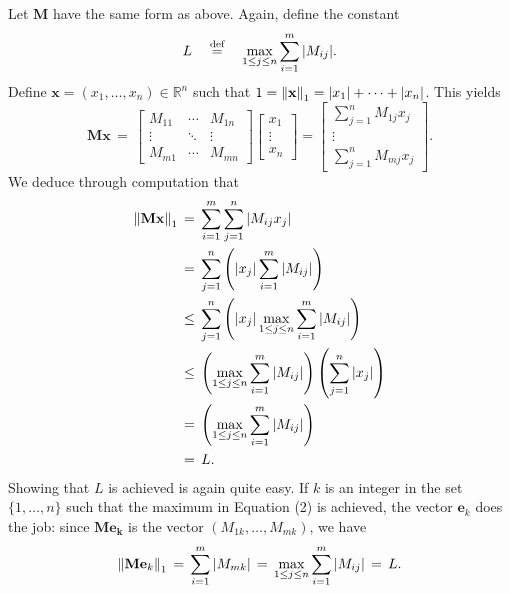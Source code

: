 \documentclass[11pt]{article}
\renewcommand{\vec}[1]{\mathbf{#1}}
\newcommand{\mat}[1]{\mathbf{#1}}
\begin{document}
Let $\mat{M}$ have the same form as above. Again, define the constant
\begin{equation}
  L \quad \stackrel{\text{def}}{=} \quad \max\limits_{1 \le j \le n} \sum\limits_{i = 1}^{m} \abs{M_{ij}}.
\end{equation}
Define $\vec{x} = (x_{1}, \ldots, x_{n}) \in \mathbb{R}^{n}$ such that $1 = \norm{\vec{x}}_{1} = \abs{x_{1}} + \cdots + \abs{x_{n}}$. This yields
\[
  \mat{M} \vec{x} \, = \, \begin{bmatrix} M_{11} & \cdots & M_{1n} \\ \vdots & \ddots & \vdots \\ M_{m1} & \cdots & M_{mn} \end{bmatrix} \begin{bmatrix} x_{1} \\ \vdots \\ x_{n} \end{bmatrix} = \begin{bmatrix} \sum\limits_{j = 1}^{n} M_{1j}x_{j} \\ \vdots \\ \sum\limits_{j = 1}^{n} M_{mj}x_{j} \end{bmatrix}.
\]
We deduce through computation that
\begin{align*}
  \norm{\mat{M}\vec{x}}_{1} \, &= \, \sum\limits_{i = 1}^{m} \sum\limits_{j = 1}^{n} \abs{M_{ij} x_{j}} \\ 
                               &= \, \sum\limits_{j = 1}^{n} \left( \abs{x_{j}} \sum\limits_{i = 1}^{m} \abs{M_{ij}} \right) \\ 
                               &\le \, \sum\limits_{j = 1}^{n} \left( \abs{x_{j}} \max\limits_{1 \le j \le n} \sum\limits_{i = 1}^{m} \abs{M_{ij}} \right) \\
                               &\le \, \left( \max\limits_{1 \le j \le n} \sum\limits_{i = 1}^{m} \abs{M_{ij}} \right) \left( \sum\limits_{j = 1}^{n} \abs{x_{j}} \right) \\
                               &= \, \left( \max\limits_{1 \le j \le n} \sum\limits_{i = 1}^{m} \abs{M_{ij}} \right) \\
                               &= \, L.
\end{align*}
Showing that $L$ is achieved is again quite easy. If $k$ is an integer in the set $\{ 1, \ldots, n \}$ such that the maximum in Equation (2) is achieved, the vector $\vec{e}_{k}$ does the job: since $\mat{M} \vec{e_{k}}$ is the vector $(M_{1k}, \ldots, M_{mk})$, we have
\[
  \norm{\mat{M}\vec{e}_{k}}_{1} \, = \, \sum\limits_{i = 1}^{m} \abs{M_{mk}} \, = \, \max\limits_{1 \le j \le n} \sum\limits_{i = 1}^{m} \abs{M_{ij}} \, = \, L.
\]
\end{document}

